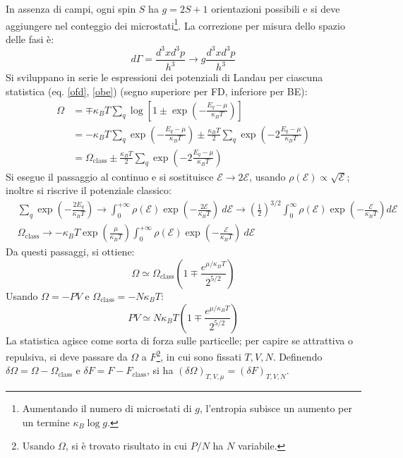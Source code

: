 \documentclass[10pt, a4paper]{scrartcl}
\numberwithin{equation}{subsection}
\theoremstyle{style1}
\begin{document}
In assenza di campi, ogni spin $S$ ha $g = 2S + 1$ orientazioni possibili e si deve aggiungere nel conteggio dei microstati\footnote{Aumentando il numero di microstati di $g$, l'entropia subisce un aumento per un termine $\kappa _B \log g$.}. La correzione per misura dello spazio delle fasi \`e:
\[
d\Gamma= \frac{d^3 x d^3 p }{h^3}\to g \frac{d^3 xd^3p}{h^3}
\] 
Si sviluppano in serie le espressioni dei potenziali di Landau per ciascuna statistica (eq. \ref{ofd}, \ref{obe}) (segno superiore per FD, inferiore per BE):
\begin{equation*}
	\begin{split}
		\Omega &= \mp \kappa _B T \sum_{q}^{} \log \left[ 1\pm \exp\left( - \frac{E_q - \mu }{\kappa _B T}\right)  \right] \\
		       &= -\kappa _B T \sum_{q}^{} \exp \left(-\frac{E_q - \mu }{\kappa _B T} \right) \pm \frac{\kappa _B T }{2}\sum_{q}^{} \exp \left(-2 \frac{E_q - \mu }{\kappa_B T }\right) \\
		       &= \Omega _\text{class} \pm \frac{\kappa _B T}{2} \sum_{q}^{} \exp \left( - 2 \frac{E_q - \mu }{\kappa _B T}\right) 
	\end{split}
\end{equation*}
Si esegue il passaggio al continuo e si sostituisce $\mathscr{E} \to 2\mathscr{E}$, usando $\rho (\mathscr{E}) \propto \sqrt{\mathscr{E}} $; inoltre si riscrive il potenziale classico:
\[
\begin{split}
	&\sum_{q}^{} \exp \left(- \frac{2 E_q}{\kappa _B T}\right)  \to \int_{0} ^{+\infty} \rho (\mathscr{E}) \exp \left(-\frac{2\mathscr{E}}{\kappa _B T}\right) \ d\mathscr{E} \to \left(\frac{1}{2}\right) ^{3 / 2} \int_{0} ^{\infty} \rho (\mathscr{E}) \exp\left(- \frac{\mathscr{E}}{\kappa _B T}\right)  d \mathscr{E}\\
	& \Omega _\text{class} \to - \kappa _B T \exp \left(\frac{\mu  }{\kappa _B T}\right)  \int_{0} ^{+\infty} \rho (\mathscr{E}) \exp \left(- \frac{\mathscr{E}}{\kappa _B T}\right) \ d \mathscr{E}
\end{split}
\] 
Da questi passaggi, si ottiene:
\begin{equation}
	\Omega \simeq \Omega _{\text{class}} \left(1 \mp \frac{e^{ \mu  / \kappa _B  T} }{2 ^{5 / 2} }\right) 
\end{equation}
Usando $\Omega  = - PV $ e $\Omega _\text{class} = - N \kappa _B T$:
\begin{equation}
	PV \simeq N\kappa _B T \left(1 \mp \frac{e^{ \mu  / \kappa _B T} }{2^{ 5 / 2} }\right) 
\end{equation}
La statistica agisce come sorta di forza sulle particelle; per capire se attrattiva o repulsiva, si deve passare da $\Omega $ a $F $\footnote{Usando $\Omega $, si \`e trovato risultato in cui $P / N$ ha $N$ variabile.}, in cui sono fissati $T,V,N$. Definendo $\delta \Omega = \Omega  - \Omega _\text{class}$ e $\delta F  = F - F_\text{class}$, si ha $(\delta \Omega ) _{T,V,\mu } = (\delta F) _{T,V,N} $. 
\end{document}
